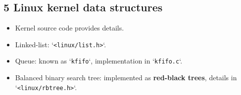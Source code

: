 \documentclass{article}
\begin{document}
\subsection*{5 Linux kernel data structures}
\begin{itemize}
    \item Kernel source code provides details.
    \item Linked-list: `\texttt{<linux/list.h>}`.
    \item Queue: known as `\texttt{kfifo}`, implementation in `\texttt{kfifo.c}`.
    \item Balanced binary search tree: implemented as \textbf{red-black trees}, details in `\texttt{<linux/rbtree.h>}`.
\end{itemize}
\end{document}
